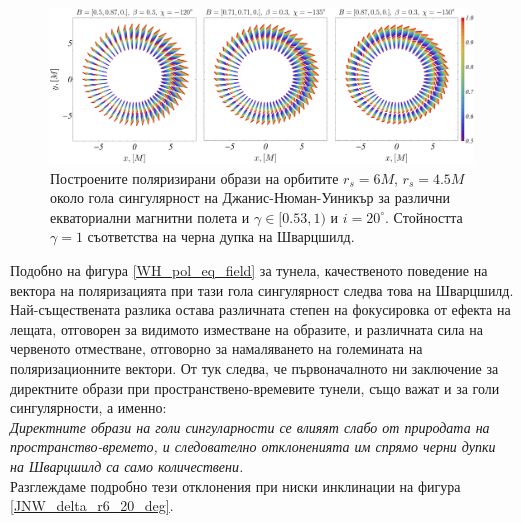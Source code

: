 \begin{figure}[!htb]
	\centering
	\includegraphics[scale = 0.25]{JNW/pol_eq.pdf}
	\caption[Поляризирани образи около гола сингулярност на Джанис-Нюман-Уиникър за различни екваториални магнитни полета.]{\small Построените поляризирани образи на орбитите $r_s = 6M$, $r_s = 4.5M$ около гола сингулярност на Джанис-Нюман-Уиникър за различни екваториални магнитни полета и $\gamma \in[0.53,1)$ и $i = 20^\circ$. Стойността $\gamma = 1$ съответства на черна дупка на Шварцшилд.} 
	\label{JNW_pol_eq_field}
\end{figure}

Подобно на фигура \ref{WH_pol_eq_field} за  тунела, качественото поведение на вектора на поляризацията при тази гола сингулярност следва това на Шварцшилд. Най-съществената разлика остава различната степен на фокусировка от ефекта на лещата, отговорен за видимото изместване на образите, и различната сила на червеното отместване, отговорно за намаляването на големината на поляризационните вектори. От тук следва, че първоначалното ни заключение за директните образи при пространствено-времевите тунели, също важат и за голи сингулярности, а именно:\\

\emph{Директните образи на голи сингуларности се влияят слабо от природата на пространство-времето, и следователно отклоненията им спрямо черни дупки на Шварцшилд са само количествени.}\\

Разглеждаме подробно тези отклонения при ниски инклинации на фигура \ref{JNW_delta_r6_20_deg}.

